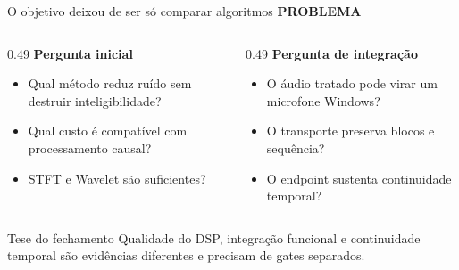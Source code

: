 \documentclass[aspectratio=169,10pt]{beamer}
\newcommand{\kicker}[1]{%
    {\color{signalorange}\scriptsize\bfseries\MakeUppercase{#1}}\par\vspace{0.08cm}
}
\begin{document}
\begin{frame}{O objetivo deixou de ser só comparar algoritmos}
    \kicker{Problema}
    \begin{columns}[T,onlytextwidth]
        \begin{column}{0.49\textwidth}
            \textbf{Pergunta inicial}
            \begin{itemize}
                \item Qual método reduz ruído sem destruir inteligibilidade?
                \item Qual custo é compatível com processamento causal?
                \item STFT e Wavelet são suficientes?
            \end{itemize}
        \end{column}
        \begin{column}{0.49\textwidth}
            \textbf{Pergunta de integração}
            \begin{itemize}
                \item O áudio tratado pode virar um microfone Windows?
                \item O transporte preserva blocos e sequência?
                \item O endpoint sustenta continuidade temporal?
            \end{itemize}
        \end{column}
    \end{columns}

    \vspace{0.35cm}
    \begin{block}{Tese do fechamento}
        Qualidade do DSP, integração funcional e continuidade temporal são
        evidências diferentes e precisam de gates separados.
    \end{block}
\end{frame}
\end{document}
